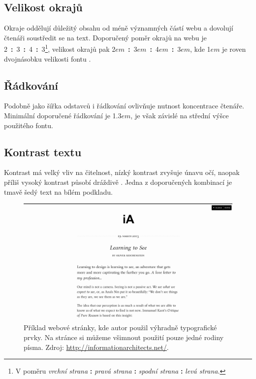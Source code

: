 \subsection{Velikost okrajů}

Okraje oddělují důležitý obsahu od méně významných částí webu a dovolují čtenáři soustředit se na text. Doporučený poměr okrajů na webu je 2~\textbf{:}~3~\textbf{:}~4~\textbf{:}~3\footnote{V poměru \textit{vrchní strana} \textbf{:} \textit{pravá strana} \textbf{:} \textit{spodní strana} \textbf{:} \textit{levá strana}.}, velikost okrajů pak 2$em$~\textbf{:}~3$em$~\textbf{:}~4$em$~\textbf{:}~3$em$, kde 1$em$ je roven dvojnásobku velikosti fontu \cite{10}.

\subsection{Řádkování}

Podobně jako šířka odstavců i řádkování ovlivňuje nutnost koncentrace čtenáře. Minimální doporučené řádkování je 1.3$em$, je však závislé na střední výšce použitého fontu.

\subsection{Kontrast textu}

Kontrast má velký vliv na čitelnost, nízký kontrast zvyšuje únavu očí, naopak příliš vysoký kontrast působí dráždivě \cite{11}. Jedna z doporučených kombinací je tmavě šedý text na bílém podkladu.

\begin{figure}[htbp]
    \centering
    \includegraphics[width=\textwidth]{images/typography.png}
    \caption{Příklad webové stránky, kde autor použil výhradně typografické prvky. Na stránce si můžeme všimnout použití pouze jedné rodiny písma. Zdroj: \url{http://informationarchitects.net/}.}
    \label{fig:web-typography}
\end{figure}
